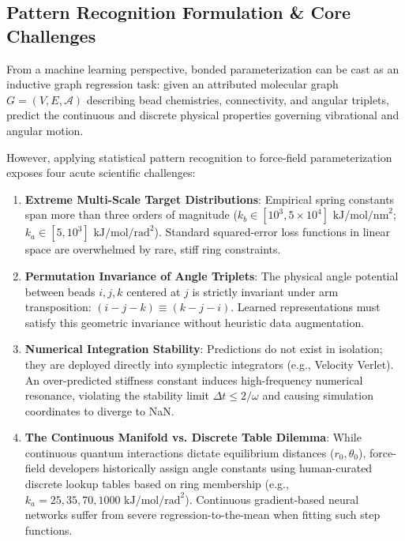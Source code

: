 \documentclass[11pt,a4paper]{article}
\begin{document}
\subsection{Pattern Recognition Formulation \& Core Challenges}
From a machine learning perspective, bonded parameterization can be cast as an inductive graph regression task: given an attributed molecular graph $G = (V, E, \mathcal{A})$ describing bead chemistries, connectivity, and angular triplets, predict the continuous and discrete physical properties governing vibrational and angular motion.

However, applying statistical pattern recognition to force-field parameterization exposes four acute scientific challenges:
\begin{enumerate}
    \item \textbf{Extreme Multi-Scale Target Distributions}: Empirical spring constants span more than three orders of magnitude ($k_b \in [10^3, 5\times 10^4]\text{ kJ/mol/nm}^2$; $k_a \in [5, 10^3]\text{ kJ/mol/rad}^2$). Standard squared-error loss functions in linear space are overwhelmed by rare, stiff ring constraints.
    \item \textbf{Permutation Invariance of Angle Triplets}: The physical angle potential between beads $i, j, k$ centered at $j$ is strictly invariant under arm transposition: $(i-j-k) \equiv (k-j-i)$. Learned representations must satisfy this geometric invariance without heuristic data augmentation.
    \item \textbf{Numerical Integration Stability}: Predictions do not exist in isolation; they are deployed directly into symplectic integrators (e.g., Velocity Verlet). An over-predicted stiffness constant induces high-frequency numerical resonance, violating the stability limit $\Delta t \le 2/\omega$ and causing simulation coordinates to diverge to NaN.
    \item \textbf{The Continuous Manifold vs. Discrete Table Dilemma}: While continuous quantum interactions dictate equilibrium distances ($r_0, \theta_0$), force-field developers historically assign angle constants using human-curated discrete lookup tables based on ring membership (e.g., $k_a = 25, 35, 70, 1000\text{ kJ/mol/rad}^2$). Continuous gradient-based neural networks suffer from severe regression-to-the-mean when fitting such step functions.
\end{enumerate}
\end{document}

